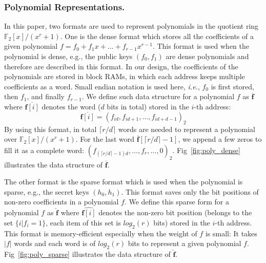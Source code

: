 \documentclass[runningheads]{llncs}
\begin{document}
\subsubsection{Polynomial Representations.}
In this paper, two formats are used to represent polynomials in
the quotient ring $\mathbb{F}_2[x]/(x^r+1)$. 
One is the dense format which stores all the coefficients 
of a given polynomial $f=f_0+f_1x+\ldots +f_{r-1}x^{r-1}$. %
This format is used when the polynomial is dense, e.g.,
the public keys $(f_0, f_1)$ are dense polynomials 
and therefore are described in this format. 
In our design, the coefficients of the polynomials are
stored in block RAMs, in which each address keeps multiple coefficients as a word.
Small endian notation is used here, \textit{i.e.}, $f_0$ is first stored, then $f_1$, and finally $f_{r-1}$.
We define such data structure for a polynomial $f$ as $\overline{\mathbf{f}}$ 
where $\overline{\mathbf{f}[i]}$ denotes the word ($d$ bits in total) stored in the $i$-th address:
\[
\overline{\mathbf{f}[i]} = (f_{id},f_{id+1},\ldots,f_{id+d-1})_2
\]
By using this format, in total $\lceil r/d \rceil$ words 
are needed to represent a polynomial over $\mathbb{F}_2[x]/(x^r+1)$.
For the last word  $\mathbf{\overline{f}}[\lceil r/d \rceil-1]$, 
we append a few zeros to fill it as a complete word: 
$(f_{(\lceil r/d\rceil-1)d},\ldots, f_{r},\ldots,0)_2$. 
Fig~\ref{fig:poly_dense} illustrates the data structure of $\overline{\mathbf{f}}$.

The other format is the sparse format which is used
when the polynomial is sparse, e.g., 
the secret keys $(h_0, h_1)$.
This format saves only the bit positions of non-zero coefficients in a polynomial $f$. 
We define this sparse form for a polynomial $f$ as $\mathbf{\hat{f}}$ where
$\hat{\mathbf{f}[i]}$ denotes the non-zero bit position (belongs to the set $\{i|f_i=1\}$, each item of this set is $log_2(r)$ bits) stored in the $i$-th address.
This format is memory-efficient especially when
the weight of $f$ is small:
It takes $|f|$ words and each word is of $log_2(r)$ bits to 
represent a given polynomial $f$. %
Fig~\ref{fig:poly_sparse} illustrates the data structure of $\mathbf{\hat{f}}$.
\end{document}
